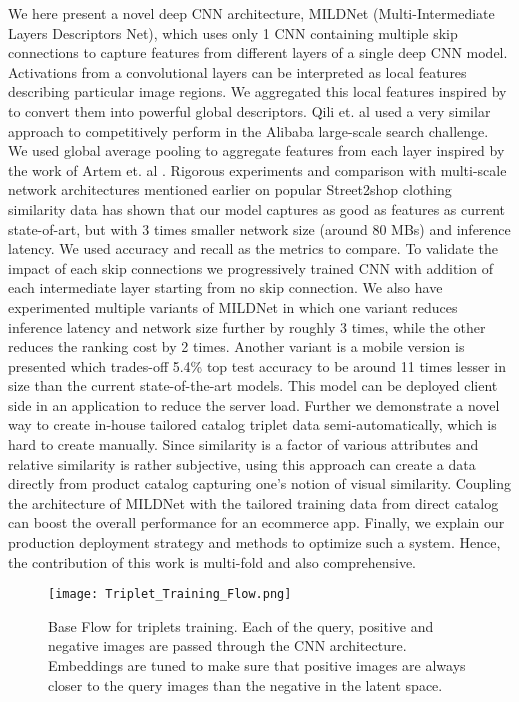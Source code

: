 \documentclass[10pt,twocolumn,letterpaper]{article}
\begin{document}
We here present a novel deep CNN architecture, MILDNet (Multi-Intermediate Layers Descriptors Net), which uses only 1 CNN containing multiple skip connections to capture features from different layers of a single deep CNN model. Activations from a convolutional layers can be interpreted as local features describing particular image regions. We aggregated this local features inspired by \cite{c5,c7,c8,c9} to convert them into powerful global descriptors. Qili et. al \cite{c9} used a very similar approach to competitively perform in the Alibaba large-scale search challenge. We used global average pooling to aggregate features from each layer inspired by the work of Artem et. al \cite{c10}. Rigorous experiments and comparison with multi-scale network architectures mentioned earlier on popular Street2shop clothing similarity data \cite{c4} has shown that our model captures as good as features as current state-of-art, but with 3 times smaller network size (around 80 MBs) and inference latency. We used accuracy and recall as the metrics to compare. To validate the impact of each skip connections we progressively trained CNN with addition of each intermediate layer starting from no skip connection. We also have experimented multiple variants of MILDNet in which one variant reduces inference latency and network size further by roughly 3 times, while the other reduces the ranking cost by 2 times. Another variant is a mobile version is presented which trades-off 5.4\% top test accuracy to be around 11 times lesser in size than the current state-of-the-art models. This model can be deployed client side in an application to reduce the server load. Further we demonstrate a novel way to create in-house tailored catalog triplet data semi-automatically, which is hard to create manually. Since similarity is a factor of various attributes and relative similarity is rather subjective, using this approach can create a data directly from product catalog capturing one's notion of visual similarity. Coupling the architecture of MILDNet with the tailored training data from direct catalog can boost the overall performance for an ecommerce app. Finally, we explain our production deployment strategy and methods to optimize such a system. Hence, the contribution of this work is multi-fold and also comprehensive.
\begin{figure}[htp]
\centering
\texttt{[image: Triplet\_Training\_Flow.png]}
\caption{Base Flow for triplets training. Each of the query, positive and negative images are passed through the CNN architecture. Embeddings are tuned to make sure that positive images are always closer to the query images than the negative in the latent space.}
\label{fig:triplet_training_flow}
\end{figure}
\end{document}
